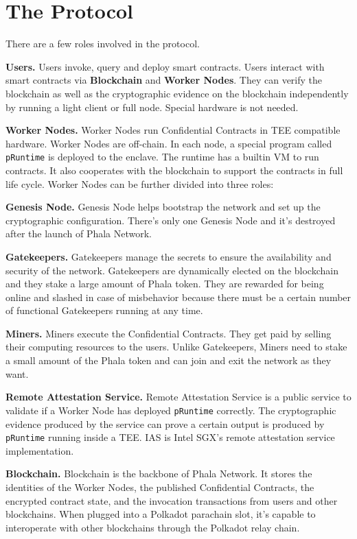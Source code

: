 \section{The Protocol}

There are a few roles involved in the protocol.

\begin{icompact}
    \item \textbf{Users.}
    Users invoke, query and deploy smart contracts. Users interact with smart contracts via \textbf{Blockchain} and \textbf{Worker Nodes}. They can verify the blockchain as well as the cryptographic evidence on the blockchain independently by running a light client or full node. Special hardware is not needed.
    \item \textbf{Worker Nodes.}
    Worker Nodes run Confidential Contracts in TEE compatible hardware. Worker Nodes are off-chain. In each node, a special program called \texttt{pRuntime} is deployed to the enclave. The runtime has a builtin VM to run contracts. It also cooperates with the blockchain to support the contracts in full life cycle. Worker Nodes can be further divided into three roles:
    \begin{icompact}
        \item \textbf{Genesis Node.}
        Genesis Node helps bootstrap the network and set up the cryptographic configuration. There's only one Genesis Node and it's destroyed after the launch of Phala Network.
        \item \textbf{Gatekeepers.}
        Gatekeepers manage the secrets to ensure the availability and security of the network. Gatekeepers are dynamically elected on the blockchain and they stake a large amount of Phala token. They are rewarded for being online and slashed in case of misbehavior because there must be a certain number of functional Gatekeepers running at any time.
        \item \textbf{Miners.}
        Miners execute the Confidential Contracts. They get paid by selling their computing resources to the users. Unlike Gatekeepers, Miners need to stake a small amount of the Phala token and can join and exit the network as they want.
    \end{icompact}
    \item \textbf{Remote Attestation Service.}
    Remote Attestation Service is a public service to validate if a Worker Node has deployed \texttt{pRuntime} correctly. The cryptographic evidence produced by the service can prove a certain output is produced by \texttt{pRuntime} running inside a TEE. IAS is Intel SGX's remote attestation service implementation.
    \item \textbf{Blockchain.}
    Blockchain is the backbone of Phala Network. It stores the identities of the Worker Nodes, the published Confidential Contracts, the encrypted contract state, and the invocation transactions from users and other blockchains. When plugged into a Polkadot parachain slot, it's capable to interoperate with other blockchains through the Polkadot relay chain.
\end{icompact}

